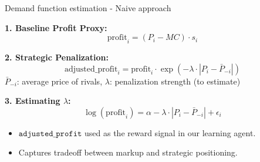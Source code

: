 \documentclass[10pt]{beamer}
\begin{document}
\begin{frame}{Demand function estimation - Naive approach}

\vspace{0.5em}
\textbf{1. Baseline Profit Proxy:}
\[
\text{profit}_i = (P_i - MC) \cdot s_i
\]

\vspace{0.5em}
\textbf{2. Strategic Penalization:}
\[
\text{adjusted\_profit}_i = \text{profit}_i \cdot \exp\left(-\lambda \cdot |P_i - \bar{P}_{-i}|\right)
\]
{\footnotesize $\bar{P}_{-i}$: average price of rivals, $\lambda$: penalization strength (to estimate)}

\vspace{0.5em}
\textbf{3. Estimating $\lambda$:}
\[
\log(\text{profit}_i) = \alpha - \lambda \cdot |P_i - \bar{P}_{-i}| + \epsilon_i
\]

\begin{itemize}
    \item $\texttt{adjusted\_profit}$ used as the reward signal in our learning agent.
    \item Captures tradeoff between markup and strategic positioning.
\end{itemize}
    
\end{frame}



%  
%  

\end{document}
